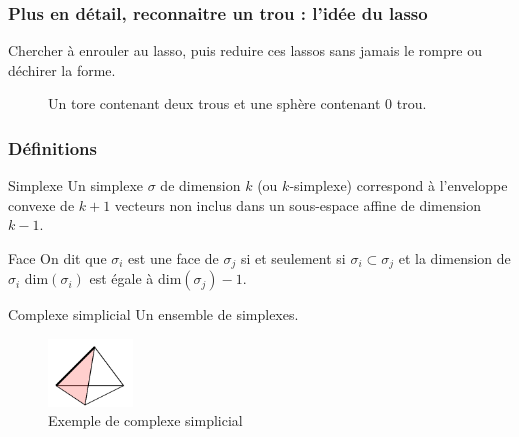 \documentclass{beamer}
\begin{document}
\begin{frame}
    \frametitle{Plus en détail, reconnaitre un trou : l'idée du lasso}
    Chercher à enrouler au lasso, puis reduire ces lassos sans jamais le rompre ou déchirer la forme.  
    \begin{figure}
        \begin{tikzpicture}

        \end{tikzpicture}
        \centering
        \caption{Un tore contenant deux trous et une sphère contenant 0 trou.}
    \end{figure}
\end{frame}

\begin{frame}
    \frametitle{Définitions}
    \begin{block}{Simplexe}
        Un simplexe $\sigma$ de dimension $k$ (ou $k$-simplexe) correspond à l'enveloppe convexe de $k+1$ vecteurs non inclus dans un sous-espace affine de dimension $k-1$.
    \end{block}

    \begin{block}{Face}
        On dit que $\sigma_i$ est une face de $\sigma_j$ si et seulement si $\sigma_i \subset \sigma_j$ et la dimension de $\sigma_i$ dim$(\sigma_i)$ est égale à dim$(\sigma_j) - 1$.
    \end{block}

    \begin{block}{Complexe simplicial}
        Un ensemble de simplexes.
    \end{block}

    \begin{figure}
        \includegraphics[width=0.2\textwidth]{../images/SimpFaceCompl.png}
        \centering
        \caption{Exemple de complexe simplicial}
    \end{figure}
    
\end{frame}
\end{document}
